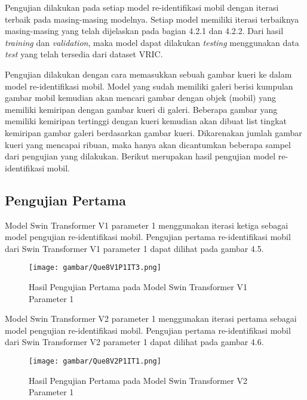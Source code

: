 Pengujian dilakukan pada setiap model re-identifikasi mobil dengan iterasi terbaik pada masing-masing modelnya. Setiap 
model memiliki iterasi terbaiknya masing-masing yang telah dijelaskan pada bagian 4.2.1 dan 4.2.2. Dari hasil \emph{training} 
dan \emph{validation}, maka model dapat dilakukan \emph{testing} menggunakan data \emph{test} yang telah tersedia dari 
dataset VRIC.

Pengujian dilakukan dengan cara memasukkan sebuah gambar kueri ke dalam model re-identifikasi mobil. Model yang sudah memiliki 
galeri berisi kumpulan gambar mobil kemudian akan mencari gambar dengan objek (mobil) yang memiliki kemiripan dengan gambar 
kueri di galeri. Beberapa gambar yang memiliki kemiripan tertinggi dengan kueri kemudian akan dibuat list tingkat kemiripan 
gambar galeri berdasarkan gambar kueri. Dikarenakan jumlah gambar kueri yang mencapai ribuan, maka hanya akan dicantumkan 
beberapa sampel dari pengujian yang dilakukan. Berikut merupakan hasil pengujian model re-identifikasi mobil.

\subsection{Pengujian Pertama}

Model Swin Transformer V1 parameter 1 menggunakan iterasi ketiga sebagai model pengujian re-identifikasi mobil. Pengujian pertama
re-identifikasi mobil dari Swin Transformer V1 parameter 1 dapat dilihat pada gambar 4.5.

\begin{figure}[ht]
  \centering
  \texttt{[image: gambar/Que8V1P1IT3.png]}
  \caption{Hasil Pengujian Pertama pada Model Swin Transformer V1 Parameter 1}
  \label{fig:hasilpengujianpertamapadamodelswintransformerv1param1}
\end{figure}

Model Swin Transformer V2 parameter 1 menggunakan iterasi pertama sebagai model pengujian re-identifikasi mobil. Pengujian pertama
re-identifikasi mobil dari Swin Transformer V2 parameter 1 dapat dilihat pada gambar 4.6.

\begin{figure}[ht]
  \centering
  \texttt{[image: gambar/Que8V2P1IT1.png]}
  \caption{Hasil Pengujian Pertama pada Model Swin Transformer V2 Parameter 1}
  \label{fig:hasilpengujianpertamapadamodelswintransformerv2param1}
\end{figure}

